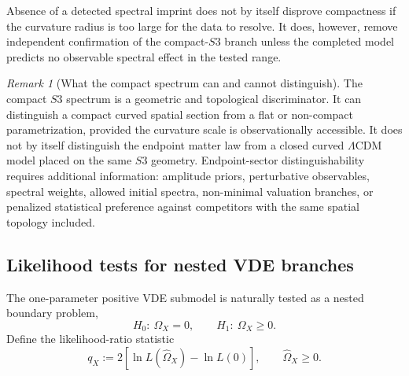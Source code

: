 \documentclass[11pt,a4paper]{article}
\def\Sthree{S3}%
\numberwithin{equation}{section}
\theoremstyle{definition}
\theoremstyle{plain}
\theoremstyle{remark}
\newtheorem{remark}[criterion]{Remark}
\newcommand{\Sthree}{S^3}
\begin{document}
Absence of a detected spectral imprint does not by itself disprove compactness if the curvature radius is too large for the data to resolve. It does, however, remove independent confirmation of the compact-\(\Sthree\) branch unless the completed model predicts no observable spectral effect in the tested range.

\begin{remark}[What the compact spectrum can and cannot distinguish]
The compact \(\Sthree\) spectrum is a geometric and topological discriminator. It can distinguish a compact curved spatial section from a flat or non-compact parametrization, provided the curvature scale is observationally accessible. It does not by itself distinguish the endpoint matter law from a closed curved \(\Lambda\)CDM model placed on the same \(\Sthree\) geometry. Endpoint-sector distinguishability requires additional information: amplitude priors, perturbative observables, spectral weights, allowed initial spectra, non-minimal valuation branches, or penalized statistical preference against competitors with the same spatial topology included.
\end{remark}

\subsection{Likelihood tests for nested VDE branches}
The one-parameter positive VDE submodel is naturally tested as a nested boundary problem,
\begin{equation}
H_0:\ \Omega_X=0,
\qquad
H_1:\ \Omega_X\ge0.
\end{equation}
Define the likelihood-ratio statistic
\begin{equation}
q_X:=2\left[
\ln L(\widehat\Omega_X)-\ln L(0)
\right],
\qquad
\widehat\Omega_X\ge0.
\end{equation}
\end{document}
